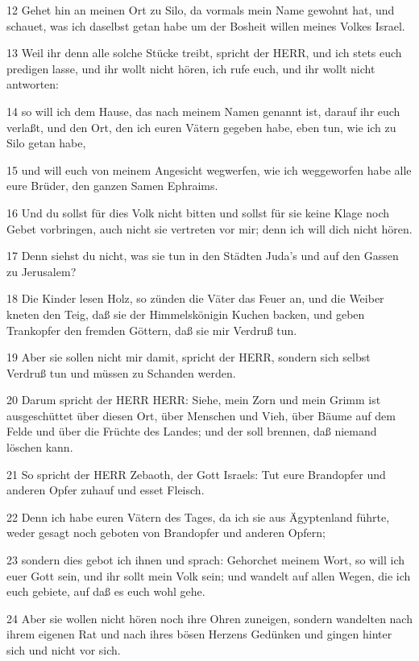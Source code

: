 \par 12 Gehet hin an meinen Ort zu Silo, da vormals mein Name gewohnt hat, und schauet, was ich daselbst getan habe um der Bosheit willen meines Volkes Israel.
\par 13 Weil ihr denn alle solche Stücke treibt, spricht der HERR, und ich stets euch predigen lasse, und ihr wollt nicht hören, ich rufe euch, und ihr wollt nicht antworten:
\par 14 so will ich dem Hause, das nach meinem Namen genannt ist, darauf ihr euch verlaßt, und den Ort, den ich euren Vätern gegeben habe, eben tun, wie ich zu Silo getan habe,
\par 15 und will euch von meinem Angesicht wegwerfen, wie ich weggeworfen habe alle eure Brüder, den ganzen Samen Ephraims.
\par 16 Und du sollst für dies Volk nicht bitten und sollst für sie keine Klage noch Gebet vorbringen, auch nicht sie vertreten vor mir; denn ich will dich nicht hören.
\par 17 Denn siehst du nicht, was sie tun in den Städten Juda's und auf den Gassen zu Jerusalem?
\par 18 Die Kinder lesen Holz, so zünden die Väter das Feuer an, und die Weiber kneten den Teig, daß sie der Himmelskönigin Kuchen backen, und geben Trankopfer den fremden Göttern, daß sie mir Verdruß tun.
\par 19 Aber sie sollen nicht mir damit, spricht der HERR, sondern sich selbst Verdruß tun und müssen zu Schanden werden.
\par 20 Darum spricht der HERR HERR: Siehe, mein Zorn und mein Grimm ist ausgeschüttet über diesen Ort, über Menschen und Vieh, über Bäume auf dem Felde und über die Früchte des Landes; und der soll brennen, daß niemand löschen kann.
\par 21 So spricht der HERR Zebaoth, der Gott Israels: Tut eure Brandopfer und anderen Opfer zuhauf und esset Fleisch.
\par 22 Denn ich habe euren Vätern des Tages, da ich sie aus Ägyptenland führte, weder gesagt noch geboten von Brandopfer und anderen Opfern;
\par 23 sondern dies gebot ich ihnen und sprach: Gehorchet meinem Wort, so will ich euer Gott sein, und ihr sollt mein Volk sein; und wandelt auf allen Wegen, die ich euch gebiete, auf daß es euch wohl gehe.
\par 24 Aber sie wollen nicht hören noch ihre Ohren zuneigen, sondern wandelten nach ihrem eigenen Rat und nach ihres bösen Herzens Gedünken und gingen hinter sich und nicht vor sich.
